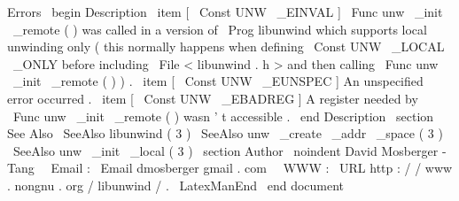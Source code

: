 {
Errors
}
\
begin
{
Description
}
\
item
[
\
Const
{
UNW
\
_EINVAL
}
]
\
Func
{
unw
\
_init
\
_remote
}
(
)
was
called
in
a
version
of
\
Prog
{
libunwind
}
which
supports
local
unwinding
only
(
this
normally
happens
when
defining
\
Const
{
UNW
\
_LOCAL
\
_ONLY
}
before
including
\
File
{
<
libunwind
.
h
>
}
and
then
calling
\
Func
{
unw
\
_init
\
_remote
}
(
)
)
.
\
item
[
\
Const
{
UNW
\
_EUNSPEC
}
]
An
unspecified
error
occurred
.
\
item
[
\
Const
{
UNW
\
_EBADREG
}
]
A
register
needed
by
\
Func
{
unw
\
_init
\
_remote
}
(
)
wasn
'
t
accessible
.
\
end
{
Description
}
\
section
{
See
Also
}
\
SeeAlso
{
libunwind
(
3
)
}
\
SeeAlso
{
unw
\
_create
\
_addr
\
_space
(
3
)
}
\
SeeAlso
{
unw
\
_init
\
_local
(
3
)
}
\
section
{
Author
}
\
noindent
David
Mosberger
-
Tang
\
\
Email
:
\
Email
{
dmosberger
gmail
.
com
}
\
\
WWW
:
\
URL
{
http
:
/
/
www
.
nongnu
.
org
/
libunwind
/
}
.
\
LatexManEnd
\
end
{
document
}
